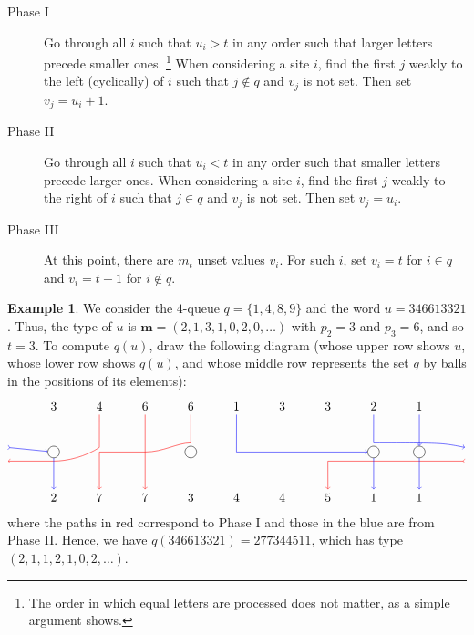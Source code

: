 \documentclass[submission]{FPSAC2018}
\newcommand{\0}{\phantom{c}}
\newcommand{\mm}{\mathbf{m}}
\theoremstyle{plain}
\theoremstyle{definition}
\newtheorem{example}[thm]{Example}
\numberwithin{equation}{section}
\begin{document}
\begin{description}
\item[Phase I]
  Go through all $i$ such that $u_i > t$ in any order such that larger letters precede smaller ones.%
  \footnote{The order in which equal letters are processed does not matter, as a simple argument shows.}
  When considering a site $i$, find the first $j$ weakly to the left (cyclically) of $i$ such that $j \notin q$ and $v_j$ is not set.
  Then set $v_j = u_i + 1$.

\item[Phase II]
  Go through all $i$ such that $u_i < t$ in any order such that smaller letters precede larger ones.
  When considering a site $i$, find the first $j$ weakly to the right of $i$ such that $j \in q$ and $v_j$ is not set.
  Then set $v_j = u_i$.

\item[Phase III]
  At this point, there are $m_t$ unset values $v_i$. For such $i$, set $v_i = t$ for $i \in q$ and $v_i = t+1$ for $i\notin q$.
\end{description}

\begin{example}
\label{ex:first_queue}
We consider the $4$-queue $q = \{1, 4, 8, 9\}$ and the word $u = 346613321$.
Thus, the type of $u$ is $\mm = (2, 1, 3, 1, 0, 2, 0, \ldots)$ with $p_2 = 3$ and $p_3 = 6$, and so $t = 3$.
To compute $q(u)$, draw the following diagram
(whose upper row shows $u$, whose lower row shows $q(u)$,
and whose middle row represents the set $q$ by balls in the positions of its elements):
\[
\begin{tikzpicture}[scale=1.3]
\node (i1) at (1,1) {$3$};
\node (i2) at (2,1) {$4$};
\node (i3) at (3,1) {$6$};
\node (i4) at (4,1) {$6$};
\node (i5) at (5,1) {$1$};
\node (i6) at (6,1) {$3$};
\node (i7) at (7,1) {$3$};
\node (i8) at (8,1) {$2$};
\node (i9) at (9,1) {$1$};
\node (t1) at (1,-1) {$2$};
\node (t2) at (2,-1) {$7$};
\node (t3) at (3,-1) {$7$};
\node (t4) at (4,-1) {$3$};
\node (t5) at (5,-1) {$4$};
\node (t6) at (6,-1) {$4$};
\node (t7) at (7,-1) {$5$};
\node (t8) at (8,-1) {$1$};
\node (t9) at (9,-1) {$1$};
\node[circle,draw=black] (q1) at (1,0) {};
\node[circle,draw=black] (q2) at (4,0) {};
\node[circle,draw=black] (q3) at (8,0) {};
\node[circle,draw=black] (q4) at (9,0) {};
\draw[->,red] (i4) -- (4,0.2) .. controls (3.7,0.2) and (3.4,0) .. (3,0) -- (2,0) -- (t2);
\draw[->,red] (i3) -- (t3);
\draw[->,red] (i2) -- (2,0.1) .. controls (1.7,-0.1) and (1.3,-0.2) .. (1,-0.2) -- (0,-0.2);
\draw[>->,red] (10,-0.2) -- (8,-0.2) -- (7,-0.2) -- (t7);
\draw[->,blue] (i5) -- (5,0) -- (q3);
\draw[->,blue] (q3) -- (t8);
\draw[->,blue] (i9) -- (q4);
\draw[->,blue] (q4) -- (t9);
\draw[->,blue] (i8) -- (8,0.2) .. controls (9.5,0.2) .. (10,0.1);
\draw[>->,blue] (0,0.1) -- (q1);
\draw[->,blue] (q1) -- (t1);
\end{tikzpicture}
\]
where the paths in red correspond to Phase I and those in the blue are from Phase II. Hence, we have $q(346613321) = 277344511$, which has type $(2,1,1,2,1,0,2,\ldots)$.
\end{example}
\end{document}
